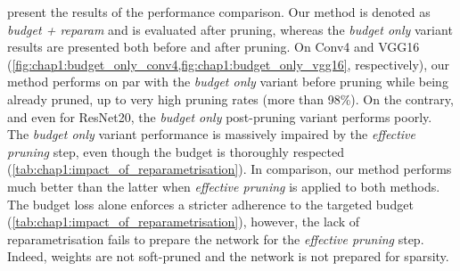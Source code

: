 present the results of the performance comparison. Our method is denoted as
\emph{budget + reparam} and is evaluated after pruning, whereas the \emph{budget
  only} variant results are presented both before and after pruning. On Conv4 and
VGG16 (\cref{fig:chap1:budget_only_conv4,fig:chap1:budget_only_vgg16},
respectively), our method performs on par with the \emph{budget only} variant
before pruning while being already pruned, up to very high pruning rates (more
than 98\%). On the contrary, and even for ResNet20, the \emph{budget only}
post-pruning variant performs poorly. The \emph{budget only} variant performance
is massively impaired by the \emph{effective pruning} step, even though the
budget is thoroughly respected (\cref{tab:chap1:impact_of_reparametrisation}).
In comparison, our method performs much better than the latter when
\textit{effective pruning} is applied to both methods. The budget loss alone
enforces a stricter adherence to the targeted budget
(\cref{tab:chap1:impact_of_reparametrisation}), however, the lack of
reparametrisation fails to prepare the network for the \emph{effective pruning}
step. Indeed, weights are not soft-pruned and the network is not prepared for
sparsity.\\

